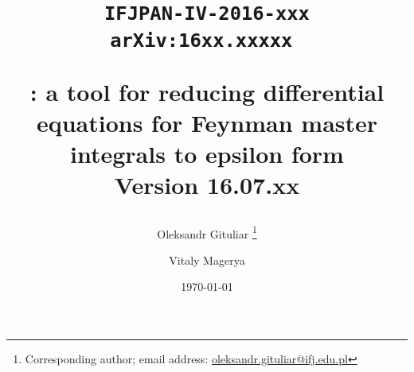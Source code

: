 \title{
  \begin{flushright}
  \tt\normalsize{IFJPAN-IV-2016-xxx}\\ 
  \tt\normalsize{arXiv:16xx.xxxxx} 
  \end{flushright}
  \vspace{1cm}
  \Large \bf \fuchsia: a tool for reducing differential equations for Feynman master integrals to epsilon form\\
  \vspace{0.5cm}
  \normalsize \bf Version 16.07.xx
}

\author[a]{Oleksandr Gituliar%
    \thanks{Corresponding author; email address:
        \href{mailto:oleksandr.gituliar@ifj.edu.pl}
            {oleksandr.gituliar@ifj.edu.pl}}}

\author[ ]{Vitaly Magerya}


\date{\today\\\vspace{0.5cm}{\bf \LARGE DRAFT}}
